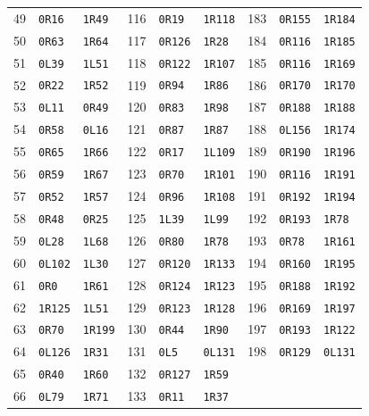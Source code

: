 \begin{longtable}{@{}rllrllrll@{}}
49 & \texttt{0R16} & \texttt{1R49} & 116 & \texttt{0R19} & \texttt{1R118} & 183 & \texttt{0R155} & \texttt{1R184}\\
50 & \texttt{0R63} & \texttt{1R64} & 117 & \texttt{0R126} & \texttt{1R28} & 184 & \texttt{0R116} & \texttt{1R185}\\
51 & \texttt{0L39} & \texttt{1L51} & 118 & \texttt{0R122} & \texttt{1R107} & 185 & \texttt{0R116} & \texttt{1R169}\\
52 & \texttt{0R22} & \texttt{1R52} & 119 & \texttt{0R94} & \texttt{1R86} & 186 & \texttt{0R170} & \texttt{1R170}\\
53 & \texttt{0L11} & \texttt{0R49} & 120 & \texttt{0R83} & \texttt{1R98} & 187 & \texttt{0R188} & \texttt{1R188}\\
54 & \texttt{0R58} & \texttt{0L16} & 121 & \texttt{0R87} & \texttt{1R87} & 188 & \texttt{0L156} & \texttt{1R174}\\
55 & \texttt{0R65} & \texttt{1R66} & 122 & \texttt{0R17} & \texttt{1L109} & 189 & \texttt{0R190} & \texttt{1R196}\\
56 & \texttt{0R59} & \texttt{1R67} & 123 & \texttt{0R70} & \texttt{1R101} & 190 & \texttt{0R116} & \texttt{1R191}\\
57 & \texttt{0R52} & \texttt{1R57} & 124 & \texttt{0R96} & \texttt{1R108} & 191 & \texttt{0R192} & \texttt{1R194}\\
58 & \texttt{0R48} & \texttt{0R25} & 125 & \texttt{1L39} & \texttt{1L99} & 192 & \texttt{0R193} & \texttt{1R78}\\
59 & \texttt{0L28} & \texttt{1L68} & 126 & \texttt{0R80} & \texttt{1R78} & 193 & \texttt{0R78} & \texttt{1R161}\\
60 & \texttt{0L102} & \texttt{1L30} & 127 & \texttt{0R120} & \texttt{1R133} & 194 & \texttt{0R160} & \texttt{1R195}\\
61 & \texttt{0R0} & \texttt{1R61} & 128 & \texttt{0R124} & \texttt{1R123} & 195 & \texttt{0R188} & \texttt{1R192}\\
62 & \texttt{1R125} & \texttt{1L51} & 129 & \texttt{0R123} & \texttt{1R128} & 196 & \texttt{0R169} & \texttt{1R197}\\
63 & \texttt{0R70} & \texttt{1R199} & 130 & \texttt{0R44} & \texttt{1R90} & 197 & \texttt{0R193} & \texttt{1R122}\\
64 & \texttt{0L126} & \texttt{1R31} & 131 & \texttt{0L5} & \texttt{0L131} & 198 & \texttt{0R129} & \texttt{0L131}\\
65 & \texttt{0R40} & \texttt{1R60} & 132 & \texttt{0R127} & \texttt{1R59} &  &  & \\
66 & \texttt{0L79} & \texttt{1R71} & 133 & \texttt{0R11} & \texttt{1R37} &  &  & \\
\end{longtable}
\endgroup
